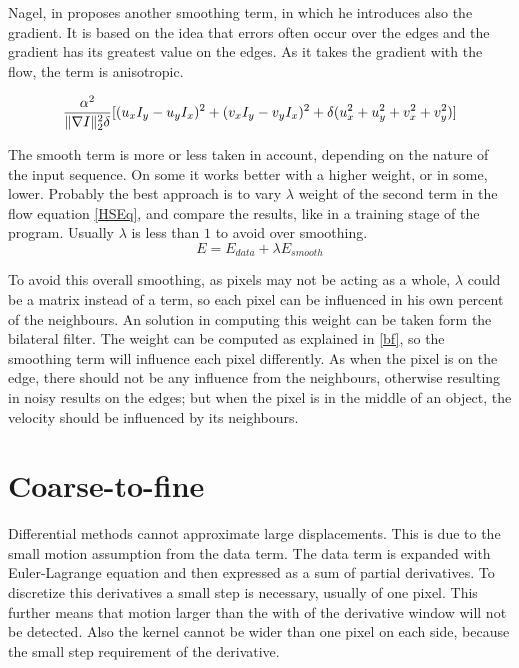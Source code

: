 \documentclass[12pt,a4paper,twoside]{report}
\begin{document}
{Nagel, in \cite{nagel1983constraints} proposes another smoothing term, in which he introduces also the gradient. It is based on the idea that errors often occur over the edges and the gradient has its greatest value on the edges. As it takes the gradient with the flow, the term is anisotropic. 

\begin{equation}
	\frac{\alpha^2}{\Arrowvert \nabla I\Arrowvert_2^2 \delta}[(u_xI_y- u_y I_x)^2+ (v_xI_y- v_y I_x)^2+ \delta(u_x^2+ u_y^2+v_x^2+ v_y^2)]
\end{equation}
 

The smooth term is more or less taken in account, depending on the nature of the input sequence. On some it works better with a higher weight, or in some, lower. Probably the best approach is to vary $\lambda$ weight of the second term in the flow equation \ref{HSEq}, and compare the results, like in a training stage of the program. Usually $\lambda$ is less than $1$ to avoid over smoothing.
\begin{equation}
	E = E_{data}+\lambda E_{smooth}
\end{equation}

To avoid this overall smoothing, as pixels may not be acting as a whole, $\lambda$ could be a matrix instead of a term, so each pixel can be influenced in his own percent of the neighbours.
An solution in computing this weight can be taken form the bilateral filter. The weight can be computed as explained in
\ref{bf}, so the smoothing term will influence each pixel differently. As when the pixel is on the edge, there should not be any influence from the neighbours, otherwise resulting in noisy results on the edges; but when the pixel is in the middle of an object, the velocity should be influenced by its neighbours.

\section{Coarse-to-fine}
Differential methods cannot approximate large displacements. This is due to the small motion assumption from the data term.
The data term is expanded with Euler-Lagrange equation and then expressed as a sum of partial derivatives. To discretize this derivatives a small step is necessary, usually of one pixel. This further means that motion larger than the with of the derivative window will not be detected. Also the kernel cannot be wider than one pixel on each side, because the small step requirement of the derivative.


}
\end{document}

